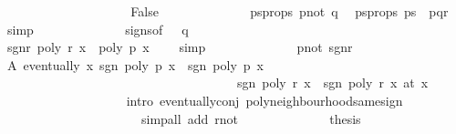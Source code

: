\begin{isabellebody}
\ \ \ \ \ \ \ \ \isamarkupfalse%
\isanewline
\ \ \ \ \ \ \ \ \ \ \isamarkupfalse%
\ False\isanewline
\ \ \ \ \ \ \ \ \ \ \ \ \isamarkupfalse%
\ ps{\isacharprime}{\isacharprime}{\isacharunderscore}props\ p{\isacharunderscore}not{\isacharunderscore}{}\ q{\isacharunderscore}{}\ \isamarkupfalse%
\ ps{\isacharprime}{\isacharunderscore}props{\isacharcolon}\ {\isachardoublequoteopen}ps{\isacharprime}\ {\isacharequal}\ {\isacharbrackleft}p{\isacharcomma}q{\isacharcomma}r{\isacharbrackright}{\isachardoublequoteclose}\ \isamarkupfalse%
\ simp\isanewline
\ \ \ \ \ \ \ \ \ \ \ \ \isamarkupfalse%
\ signs{\isacharbrackleft}of\ {}{\isacharbrackright}\ \ q{\isacharunderscore}{}\ \isanewline
\ \ \ \ \ \ \ \ \ \ \ \ \ \ \ \ \isamarkupfalse%
\ sgn{\isacharunderscore}r{\isacharcolon}\ {\isachardoublequoteopen}poly\ r\ x\ {\isacharasterisk}\ poly\ p\ x\ {\isacharless}\ {}{\isachardoublequoteclose}\ \isamarkupfalse%
\ simp\isanewline
\ \ \ \ \ \ \ \ \ \ \ \ \isamarkupfalse%
\ p{\isacharunderscore}not{\isacharunderscore}{}\ sgn{\isacharunderscore}r\isanewline
\ \ \ \ \ \ \ \ \ \ \ \ \ \ \isamarkupfalse%
\ A{\isacharcolon}\ {\isachardoublequoteopen}eventually\ {\isacharparenleft}{\isasymlambda}x{\isachardot}\ sgn\ {\isacharparenleft}poly\ p\ x{\isacharparenright}\ {\isacharequal}\ sgn\ {\isacharparenleft}poly\ p\ x\ {\isasymand}\isanewline
\ \ \ \ \ \ \ \ \ \ \ \ \ \ \ \ \ \ \ \ \ \ \ \ \ \ \ \ \ \ \ \ \ \ \ \ \ sgn\ {\isacharparenleft}poly\ r\ x{\isacharparenright}\ {\isacharequal}\ sgn\ {\isacharparenleft}poly\ r\ x\ {\isacharparenleft}at\ x\isanewline
\ \ \ \ \ \ \ \ \ \ \ \ \ \ \ \ \ \ \isamarkupfalse%
\ {\isacharparenleft}intro\ eventually{\isacharunderscore}conj\ poly{\isacharunderscore}neighbourhood{\isacharunderscore}same{\isacharunderscore}sign{\isacharcomma}\ \isanewline
\ \ \ \ \ \ \ \ \ \ \ \ \ \ \ \ \ \ \ \ \ \ simp{\isacharunderscore}all\ add{\isacharcolon}\ r{\isacharunderscore}not{\isacharunderscore}{}{\isacharparenright}\isanewline
\ \ \ \ \ \ \ \ \ \ \ \ \isamarkupfalse%
\ {\isacharquery}thesis\isanewline
\ \ \ \ \ \ \ \ \ \ \ \ \isamarkupfalse%

\end{isabellebody}
